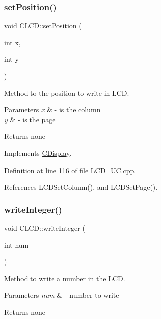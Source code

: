 \subsubsection{\texorpdfstring{set\+Position()}{setPosition()}}
{\footnotesize\ttfamily void C\+L\+C\+D\+::set\+Position (\begin{DoxyParamCaption}\item[{int}]{x,  }\item[{int}]{y }\end{DoxyParamCaption})\hspace{0.3cm}{\ttfamily [virtual]}}



Method to the position to write in L\+CD. 


\begin{DoxyParams}{Parameters}
{\em x} & -\/ is the column \\
\hline
{\em y} & -\/ is the page \\
\hline
\end{DoxyParams}
\begin{DoxyReturn}{Returns}
none 
\end{DoxyReturn}


Implements \mbox{\hyperlink{class_c_display}{C\+Display}}.



Definition at line 116 of file L\+C\+D\+\_\+\+U\+C.\+cpp.



References L\+C\+D\+Set\+Column(), and L\+C\+D\+Set\+Page().

\mbox{\label{class_c_l_c_d_ab5547c17a38247c90db076b8c04baa17}} 
\subsubsection{\texorpdfstring{write\+Integer()}{writeInteger()}}
{\footnotesize\ttfamily void C\+L\+C\+D\+::write\+Integer (\begin{DoxyParamCaption}\item[{int}]{num }\end{DoxyParamCaption})\hspace{0.3cm}{\ttfamily [virtual]}}



Method to write a number in the L\+CD. 


\begin{DoxyParams}{Parameters}
{\em num} & -\/ number to write \\
\hline
\end{DoxyParams}
\begin{DoxyReturn}{Returns}
none 
\end{DoxyReturn}


